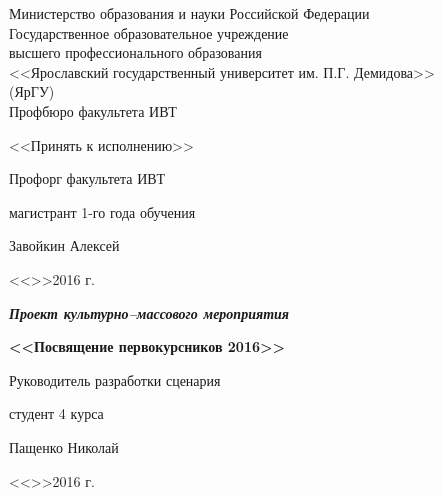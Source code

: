 \documentclass[a4paper, 12pt]{extarticle}
\begin{document}
\setcounter{tocdepth}{3}





{
\thispagestyle{empty}

\begin{center}
	
	Министерство образования и науки Российской Федерации\\[0.3cm]
	Государственное образовательное учреждение\\
	высшего профессионального образования\\
	<<Ярославский государственный университет им. П.Г. Демидова>>\\
	(ЯрГУ)\\[0.3cm]
	
	Профбюро факультета ИВТ
	
	\bigskip
	\bigskip	
	
	\begin{flushright}
		<<Принять к исполнению>>
	\end{flushright}
	
	\begin{flushright}
		Профорг факультета ИВТ\par
		магистрант 1-го года обучения\par
		\underline{\hspace{3.2cm}}Завойкин Алексей\par
		<<\underline{\hspace{0.5cm}}>>\underline{\hspace{3.4cm}}2016 г.\par
	\end{flushright}
	
	\bigskip
	
	{\textbf
		{\textit
			{Проект культурно--массового мероприятия}
		}
	}
	\\
	
	\bigskip
	\bigskip
	
	{\bf
		<<Посвящение первокурсников 2016>> 
	}
\end{center}

\medskip

\begin{flushright}
	Руководитель разработки сценария\par
	студент 4 курса\par
	\underline{\hspace{3.5cm}}Пащенко Николай\par
	<<\underline{\hspace{0.8cm}}>>\underline{\hspace{3.5cm}}2016 г.\par
\end{flushright}

}
\end{document}
